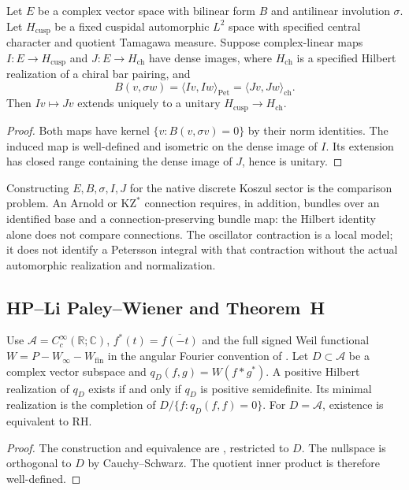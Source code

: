 \begin{proposition}
\label{v4-arith:w6-i:thm:W5-C-alignment}
Let $E$ be a complex vector space with bilinear form $B$ and
antilinear involution $\sigma$. Let $H_{\mathrm{cusp}}$ be a fixed
cuspidal automorphic $L^2$ space with specified central character
and quotient Tamagawa measure. Suppose complex-linear maps
$I:E\to H_{\mathrm{cusp}}$ and $J:E\to H_{\mathrm{ch}}$ have dense
images, where $H_{\mathrm{ch}}$ is a specified Hilbert realization
of a chiral bar pairing, and
\[
 B(v,\sigma w)=\langle Iv,Iw\rangle_{\mathrm{Pet}}
             =\langle Jv,Jw\rangle_{\mathrm{ch}}.
\]
Then $Iv\mapsto Jv$ extends uniquely to a unitary
$H_{\mathrm{cusp}}\to H_{\mathrm{ch}}$.
\end{proposition}
\begin{proof}
Both maps have kernel $\{v:B(v,\sigma v)=0\}$ by their norm
identities. The induced map is well-defined and isometric on the
dense image of $I$. Its extension has closed range containing the
dense image of $J$, hence is unitary.
\end{proof}
Constructing $E,B,\sigma,I,J$ for the native discrete Koszul sector
is the comparison problem. An Arnold or $\mathrm{KZ}^*$ connection
requires, in addition, bundles over an identified base and a
connection-preserving bundle map: the Hilbert identity alone does
not compare connections. The oscillator contraction is a local
model; it does not identify a Petersson integral with that contraction
without the actual automorphic realization and normalization.

\subsection{HP--Li Paley--Wiener and Theorem~H}
\label{v4-arith:w6-i:W5-A-alignment}


\begin{theorem}
\label{v4-arith:w6-i:thm:W5-A-alignment}
Use $\mathscr A=C_c^\infty(\mathbb R;\mathbb C)$,
$f^*(t)=\overline{f(-t)}$ and the full signed Weil functional
$W=P-W_\infty-W_{\mathrm{fin}}$ in the angular Fourier convention
of .
Let $D\subset\mathscr A$ be a complex vector subspace and
$q_D(f,g)=W(f*g^*)$. A positive Hilbert realization of $q_D$
exists if and only if $q_D$ is positive semidefinite.
Its minimal realization is the completion of
$D/\{f:q_D(f,f)=0\}$.
For $D=\mathscr A$, existence is equivalent to RH.
\end{theorem}
\begin{proof}
The construction and equivalence are
, restricted to $D$.
The nullspace is orthogonal to $D$ by Cauchy--Schwarz.
The quotient inner product is therefore well-defined.
\end{proof}

